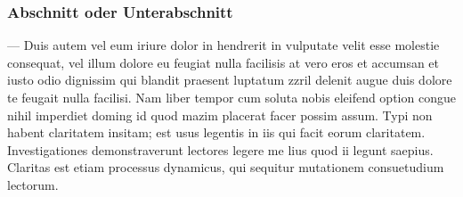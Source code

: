 \subsubsection{Abschnitt oder Unterabschnitt}


 --- Duis autem vel eum iriure dolor in
hendrerit in vulputate velit esse molestie consequat, vel
illum dolore eu feugiat nulla facilisis at vero eros et
accumsan et iusto odio dignissim qui blandit praesent
luptatum zzril delenit augue duis dolore te feugait nulla
facilisi. Nam liber tempor cum soluta nobis eleifend option
congue nihil imperdiet doming id quod mazim placerat facer
possim assum. Typi non habent claritatem insitam; est usus
legentis in iis qui facit eorum claritatem. Investigationes
demonstraverunt lectores legere me lius quod ii legunt
saepius. Claritas est etiam processus dynamicus, qui sequitur
mutationem consuetudium lectorum.

